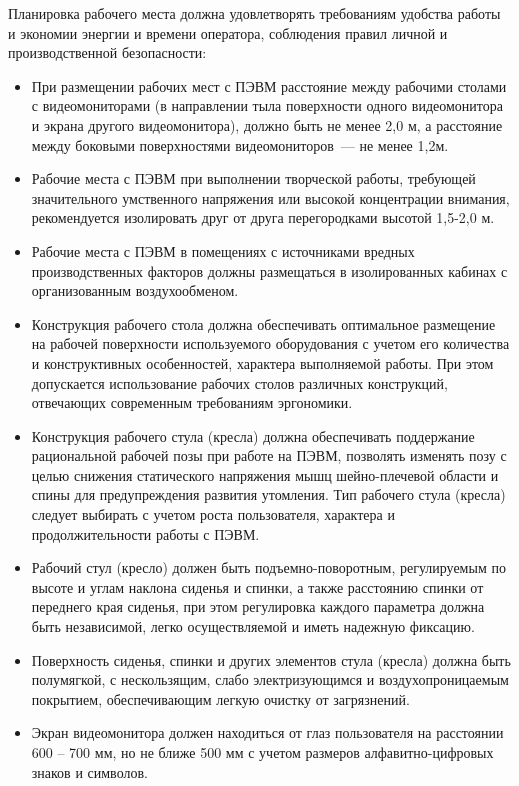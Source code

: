 Планировка рабочего места должна удовлетворять требованиям удобства работы и экономии энергии и времени оператора, соблюдения правил личной и производственной безопасности:
\begin{itemize}
  \item При размещении рабочих мест с ПЭВМ расстояние между рабочими столами с видеомониторами (в направлении тыла поверхности одного видеомонитора и экрана другого видеомонитора), должно быть не менее 2,0 м, а расстояние между боковыми поверхностями видеомониторов~--- не менее 1,2м.
  \item Рабочие места с ПЭВМ при выполнении творческой работы, требующей значительного умственного напряжения или высокой концентрации внимания, рекомендуется изолировать друг от друга перегородками высотой 1,5-2,0 м.
  \item Рабочие места с ПЭВМ в помещениях с источниками вредных производственных факторов должны размещаться в изолированных кабинах с организованным воздухообменом.
  \item Конструкция рабочего стола должна обеспечивать оптимальное размещение на рабочей поверхности используемого оборудования с учетом его количества и конструктивных особенностей, характера выполняемой работы. При этом допускается использование рабочих столов различных конструкций, отвечающих современным требованиям эргономики.
  \item Конструкция рабочего стула (кресла) должна обеспечивать поддержание рациональной рабочей позы при работе на ПЭВМ, позволять изменять позу с целью снижения статического напряжения мышц шейно-плечевой области и спины для предупреждения развития утомления. Тип рабочего стула (кресла) следует выбирать с учетом роста пользователя, характера и продолжительности работы с ПЭВМ.
  \item Рабочий стул (кресло) должен быть подъемно-поворотным, регулируемым по высоте и углам наклона сиденья и спинки, а также расстоянию спинки от переднего края сиденья, при этом регулировка каждого параметра должна быть независимой, легко осуществляемой и иметь надежную фиксацию.
  \item Поверхность сиденья, спинки и других элементов стула (кресла) должна быть полумягкой, с нескользящим, слабо электризующимся и воздухопроницаемым покрытием, обеспечивающим легкую очистку от загрязнений.
  \item Экран видеомонитора должен находиться от глаз пользователя на расстоянии 600 -- 700 мм, но не ближе 500 мм с учетом размеров алфавитно-цифровых знаков и символов.
\end{itemize}

